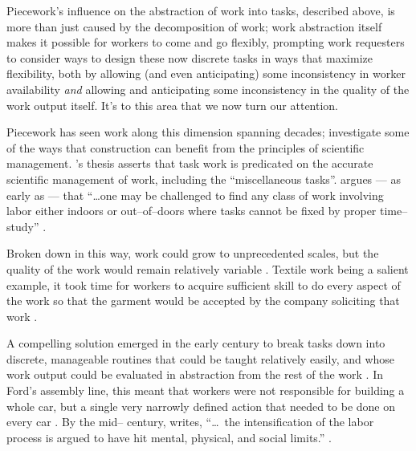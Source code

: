 \documentclass[trackingWork]{subfiles}
\begin{document}
Piecework's influence on the abstraction of work into tasks,
described above, is more than just caused by the decomposition of work;
work abstraction itself makes it possible for workers to come and go flexibly,
prompting work requesters to consider ways to design these now discrete tasks in ways that
maximize flexibility, both by allowing (and even anticipating) some inconsistency in worker availability
\textit{and} allowing and anticipating some inconsistency in the quality of the work output itself.
It's to this area that we now turn our attention.






















Piecework has seen work along this dimension spanning decades;
\citeauthor{thompson1913time} investigate some of the ways that
construction can benefit from the principles of scientific management.
\citeauthor{thompson1913time}'s thesis asserts that
task work is predicated on the accurate scientific management of work,
including the ``miscellaneous tasks''.
\citeauthor{thompson1913time} argues
--- as early as \citeyear{thompson1913time} ---
that ``\dots one may be challenged to find any class of work
involving labor either indoors or out--of--doors
where tasks cannot be fixed by proper time--study''
\cite{thompson1913time}.

Broken down in this way, work could grow to unprecedented scales,
but the quality of the work would remain relatively variable
\cite{murray1983decentralisation}.
Textile work being a salient example,
it took time for workers to acquire sufficient skill
to do every aspect of the work so that the garment would be accepted by the company soliciting that work
\cite{vezina1992light}.

A compelling solution emerged in the early  century to break tasks down into discrete,
manageable routines that could be taught relatively easily,
and whose work output could be evaluated in abstraction from the rest of the work
\cite{restructuringPieceworkBaker}.
In Ford's assembly line, this meant that workers were not responsible for building a whole car,
but a single very narrowly defined action that needed to be done on every car
\cite{towardsGlobalFordism}.
By the mid-- century, \citeauthor{schoenberger1988fordism} writes,
``\dots~the intensification of the labor process is argued to have hit mental, physical, and social limits.''
\cite{schoenberger1988fordism}.
\end{document}
